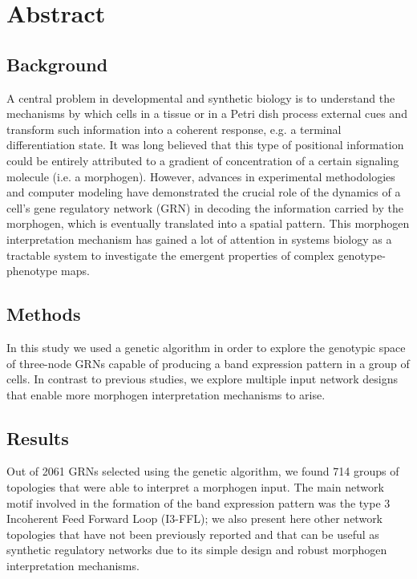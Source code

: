 \documentclass[10pt,letterpaper]{article}
\begin{document}
\section*{Abstract}

\subsection*{Background}
A central problem in developmental and synthetic biology is to understand the
mechanisms by which cells in a tissue or in a Petri dish process external cues
and transform such information into a coherent response, e.g. a terminal
differentiation state. It was long believed that this type of positional
information could be entirely attributed to a gradient of concentration of a
certain signaling molecule (i.e. a morphogen). However, advances in experimental
methodologies and computer modeling have demonstrated the crucial role of the
dynamics of a cell's gene regulatory network (GRN) in decoding the information
carried by the morphogen, which is eventually translated into a spatial
pattern. This morphogen interpretation mechanism has gained a lot of attention
in systems biology as a tractable system to investigate the emergent properties
of complex genotype-phenotype maps.

\subsection*{Methods}
In this study we used a genetic algorithm in order to explore the genotypic
space of three-node GRNs capable of producing a band expression pattern in a
group of cells. In contrast to previous studies, we explore multiple input
network designs that enable more morphogen interpretation mechanisms to arise.

\subsection*{Results}
Out of 2061 GRNs selected using the genetic algorithm, we found 714 groups of
topologies that were able to interpret a morphogen input. The main network motif
involved in the formation of the band expression pattern was the type 3
Incoherent Feed Forward Loop (I3-FFL); we also present here other network
topologies that have not been previously reported and that can be useful as
synthetic regulatory networks due to its simple design and robust morphogen
interpretation mechanisms.

\end{document}
